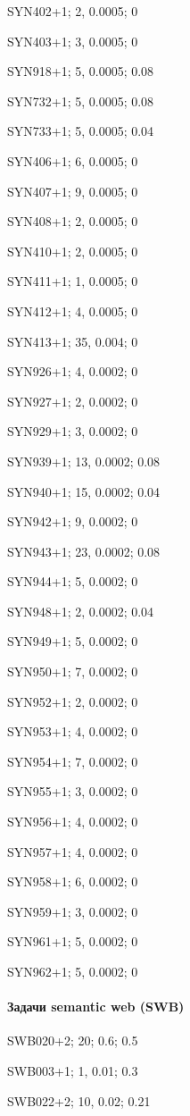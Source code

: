 SYN402+1; 2, 0.0005; 0

SYN403+1; 3, 0.0005; 0

SYN918+1; 5, 0.0005; 0.08

SYN732+1; 5, 0.0005; 0.08

SYN733+1; 5, 0.0005; 0.04

SYN406+1; 6, 0.0005; 0

SYN407+1; 9, 0.0005; 0

SYN408+1; 2, 0.0005; 0

SYN410+1; 2, 0.0005; 0

SYN411+1; 1, 0.0005; 0

SYN412+1; 4, 0.0005; 0

SYN413+1; 35, 0.004; 0

SYN926+1; 4, 0.0002; 0

SYN927+1; 2, 0.0002; 0

SYN929+1; 3, 0.0002; 0

SYN939+1; 13, 0.0002; 0.08

SYN940+1; 15, 0.0002; 0.04

SYN942+1; 9, 0.0002; 0

SYN943+1; 23, 0.0002; 0.08

SYN944+1; 5, 0.0002; 0

SYN948+1; 2, 0.0002; 0.04

SYN949+1; 5, 0.0002; 0

SYN950+1; 7, 0.0002; 0

SYN952+1; 2, 0.0002; 0

SYN953+1; 4, 0.0002; 0

SYN954+1; 7, 0.0002; 0

SYN955+1; 3, 0.0002; 0

SYN956+1; 4, 0.0002; 0

SYN957+1; 4, 0.0002; 0

SYN958+1; 6, 0.0002; 0

SYN959+1; 3, 0.0002; 0

SYN961+1; 5, 0.0002; 0

SYN962+1; 5, 0.0002; 0

\paragraph{Задачи semantic web (SWB)}

SWB020+2; 20; 0.6; 0.5

SWB003+1; 1, 0.01; 0.3

SWB022+2; 10, 0.02; 0.21

